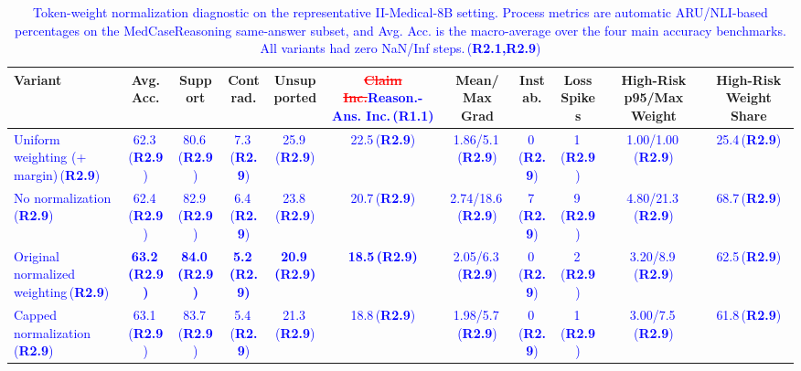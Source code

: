 \documentclass[a4paper,fleqn,doubleblind]{cas-sc}
\DeclareRobustCommand{\deleted}[1]{\textcolor{red}{\sout{#1}}}
\DeclareRobustCommand{\added}[1]{\textcolor{blue}{#1}}
\DeclareRobustCommand{\revtag}[1]{\textcolor{blue}{\scriptsize\,(\textbf{#1})}}
\begin{document}
\begin{table}[htbp]
    \centering
    \scriptsize
    \setlength{\tabcolsep}{3pt}
    \caption{\added{Token-weight normalization diagnostic on the representative II-Medical-8B setting. Process metrics are automatic ARU/NLI-based percentages on the MedCaseReasoning same-answer subset, and Avg. Acc. is the macro-average over the four main accuracy benchmarks. All variants had zero NaN/Inf steps.}\revtag{R2.1,R2.9}}
    \label{tab:normalization_stability_diagnostic}
    \begin{adjustbox}{max width=\textwidth}
    \begin{tabular}{lcccccccccc}
        \toprule
        \textbf{Variant} & \textbf{Avg. Acc.} & \textbf{Support} & \textbf{Contrad.} & \textbf{Unsupported} & \textbf{\deleted{Claim Inc.}\added{Reason.-Ans. Inc.}\revtag{R1.1}} & \textbf{Mean/Max Grad} & \textbf{Instab.} & \textbf{Loss Spikes} & \textbf{High-Risk p95/Max Weight} & \textbf{High-Risk Weight Share} \\
        \midrule
        \added{Uniform weighting (+ margin)}\revtag{R2.9} & \added{62.3}\revtag{R2.9} & \added{80.6}\revtag{R2.9} & \added{7.3}\revtag{R2.9} & \added{25.9}\revtag{R2.9} & \added{22.5}\revtag{R2.9} & \added{1.86/5.1}\revtag{R2.9} & \added{0}\revtag{R2.9} & \added{1}\revtag{R2.9} & \added{1.00/1.00}\revtag{R2.9} & \added{25.4}\revtag{R2.9} \\
        \added{No normalization}\revtag{R2.9} & \added{62.4}\revtag{R2.9} & \added{82.9}\revtag{R2.9} & \added{6.4}\revtag{R2.9} & \added{23.8}\revtag{R2.9} & \added{20.7}\revtag{R2.9} & \added{2.74/18.6}\revtag{R2.9} & \added{7}\revtag{R2.9} & \added{9}\revtag{R2.9} & \added{4.80/21.3}\revtag{R2.9} & \added{68.7}\revtag{R2.9} \\
        \added{Original normalized weighting}\revtag{R2.9} & \textbf{\added{63.2}\revtag{R2.9}} & \textbf{\added{84.0}\revtag{R2.9}} & \textbf{\added{5.2}\revtag{R2.9}} & \textbf{\added{20.9}\revtag{R2.9}} & \textbf{\added{18.5}\revtag{R2.9}} & \added{2.05/6.3}\revtag{R2.9} & \added{0}\revtag{R2.9} & \added{2}\revtag{R2.9} & \added{3.20/8.9}\revtag{R2.9} & \added{62.5}\revtag{R2.9} \\
        \added{Capped normalization}\revtag{R2.9} & \added{63.1}\revtag{R2.9} & \added{83.7}\revtag{R2.9} & \added{5.4}\revtag{R2.9} & \added{21.3}\revtag{R2.9} & \added{18.8}\revtag{R2.9} & \added{1.98/5.7}\revtag{R2.9} & \added{0}\revtag{R2.9} & \added{1}\revtag{R2.9} & \added{3.00/7.5}\revtag{R2.9} & \added{61.8}\revtag{R2.9} \\
        \bottomrule
    \end{tabular}
    \end{adjustbox}
\end{table}
\end{document}
